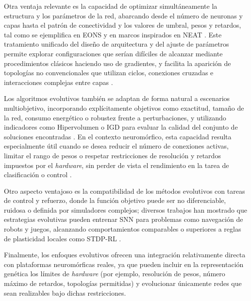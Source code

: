 Otra ventaja relevante es la capacidad de optimizar simultáneamente la estructura y los parámetros de la red, abarcando desde el número de neuronas y capas hasta el patrón de conectividad y los valores de umbral, pesos y retardos, tal como se ejemplifica en EONS y en marcos inspirados en NEAT \cite{Schuman2020evooptineuro, Stanley2002NEAT}. Este tratamiento unificado del diseño de arquitectura y del ajuste de parámetros permite explorar configuraciones que serían difíciles de alcanzar mediante procedimientos clásicos haciendo uso de gradientes, y facilita la aparición de topologías no convencionales que utilizan ciclos, conexiones cruzadas e interacciones complejas entre capas \cite{Elbrecht2020-neuro-snn, Schuman2020evooptineuro}.

Los algoritmos evolutivos también se adaptan de forma natural a escenarios multiobjetivo, incorporando explícitamente objetivos como exactitud, tamaño de la red, consumo energético o robustez frente a perturbaciones, y utilizando indicadores como Hipervolumen o IGD para evaluar la calidad del conjunto de soluciones encontradas \cite{Jin2007evo-multi-snn, dimovska2020multiobjectiveoptimizationsizeresilience}. En el contexto neuromórfico, esta capacidad resulta especialmente útil cuando se desea reducir el número de conexiones activas, limitar el rango de pesos o respetar restricciones de resolución y retardos impuestos por el \textit{hardware}, sin perder de vista el rendimiento en la tarea de clasificación o control \cite{Branquinho2023-neuro-conv-snn, Schuman2020evooptineuro, Schuman2022Opportunities}.

Otro aspecto ventajoso es la compatibilidad de los métodos evolutivos con tareas de control y refuerzo, donde la función objetivo puede ser no diferenciable, ruidosa o definida por simuladores complejos; diversos trabajos han mostrado que estrategias evolutivas pueden entrenar SNN para problemas como navegación de robots y juegos, alcanzando comportamientos comparables o superiores a reglas de plasticidad locales como STDP-RL \cite{Hasegan2022snn-rl, Shen2024EvolutionarySNN}.

Finalmente, los enfoques evolutivos ofrecen una integración relativamente directa con plataformas neuromórficas reales, ya que pueden incluir en la representación genética los límites de \textit{hardware} (por ejemplo, resolución de pesos, número máximo de retardos, topologías permitidas) y evolucionar únicamente redes que sean realizables bajo dichas restricciones.



